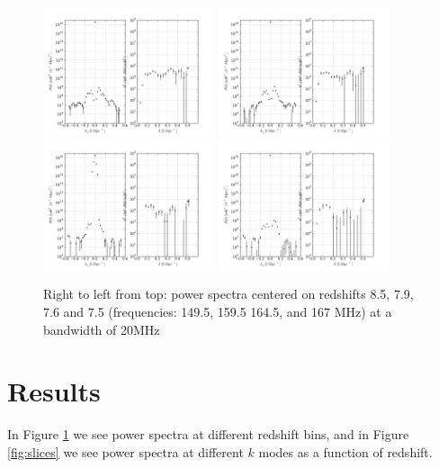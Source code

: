 \documentclass[preprint]{aastex}
\begin{document}
\begin{figure}
\centering
\includegraphics[width=0.45\textwidth]{figures/pspec_Mar24_psa32_zbins_1_80_119_I.png}
\includegraphics[width=0.45\textwidth]{figures/pspec_Mar24_psa32_zbins_1_100_139_I.png}
\includegraphics[width=0.45\textwidth]{figures/pspec_Mar24_psa32_zbins_1_110_149_I.png}
\includegraphics[width=0.45\textwidth]{figures/pspec_Mar24_psa32_zbins_1_119_150_I.png}
\caption{\label{fig:pspecs} Right to left from top: power spectra centered on redshifts 8.5, 7.9, 7.6 and 7.5 (frequencies: 149.5, 159.5 164.5, and 167 MHz) at a bandwidth of 20MHz}
\end{figure}
\section{Results}
\label{sec:results}
In  Figure \ref{fig:pspecs} we see power spectra at different redshift bins, and in Figure \ref{fig:slices} we see power spectra at different $k$ modes as a function of redshift.
\end{document}
